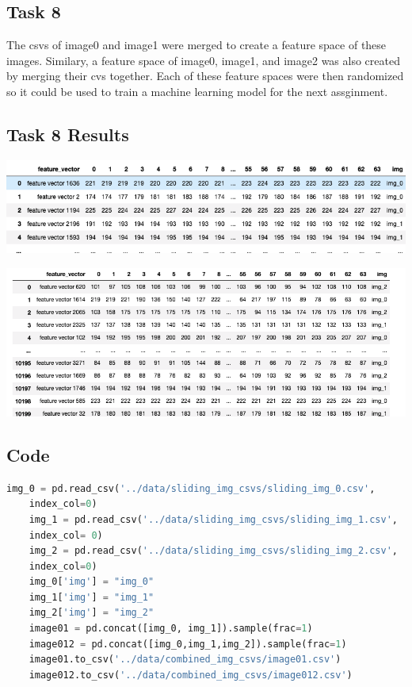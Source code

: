 \documentclass{article}
\begin{document}
\begin{multicols}{2}
	\section{Task 8}
	The csvs of image0 and image1 were merged to create a feature space of these images. Similary, a feature space of image0, image1, and image2 was also created by merging their cvs together. Each of these feature spaces were then randomized so it could be used to train a machine learning model for the next assginment. 
	
	\subsection{Task 8 Results}
	\centering
	\includegraphics[scale=0.2]{../screenshots/merge01.png}
	
	\centering
		\includegraphics[scale=0.25]{../screenshots/merge012.png}
\end{multicols}

\subsection{Code}
\begin{lstlisting}[language=Python]
	img_0 = pd.read_csv('../data/sliding_img_csvs/sliding_img_0.csv',
	index_col=0)
	img_1 = pd.read_csv('../data/sliding_img_csvs/sliding_img_1.csv', 
	index_col= 0)
	img_2 = pd.read_csv('../data/sliding_img_csvs/sliding_img_2.csv', 
	index_col=0)
	img_0['img'] = "img_0"
	img_1['img'] = "img_1"
	img_2['img'] = "img_2"
	image01 = pd.concat([img_0, img_1]).sample(frac=1)
	image012 = pd.concat([img_0,img_1,img_2]).sample(frac=1)
	image01.to_csv('../data/combined_img_csvs/image01.csv')
	image012.to_csv('../data/combined_img_csvs/image012.csv')
\end{lstlisting}
\end{document}
